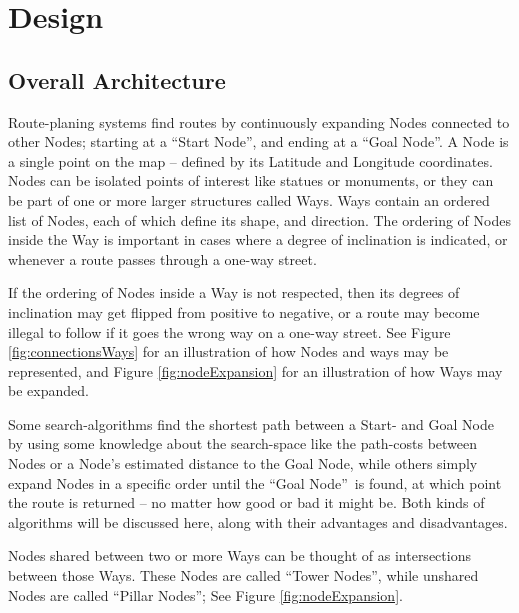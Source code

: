 
\chapter{Design}

\section{Overall Architecture}
Route-planing systems find routes by continuously expanding Nodes connected to other Nodes; starting at a \textquotedblleft Start Node\textquotedblright, and ending at a \textquotedblleft Goal Node\textquotedblright. 
A Node is a single point on the map -- defined by its Latitude and Longitude coordinates. Nodes can be isolated points of interest like statues or monuments, or they can be part of one or more larger structures called Ways.
Ways contain an ordered list of Nodes, each of which define its shape, and direction. The ordering of Nodes inside the Way is important in cases where a degree of inclination is indicated, or whenever a route passes through a one-way street.

If the ordering of Nodes inside a Way is not respected, then its degrees of inclination may get flipped from positive to negative, or a route may become illegal to follow if it goes the wrong way on a one-way street. See Figure \ref{fig:connectionsWays} for an illustration of how Nodes and ways may be represented, and Figure \ref{fig:nodeExpansion} for an illustration of how Ways may be expanded.

Some search-algorithms find the shortest path between a Start- and Goal Node by using some knowledge about the search-space like the path-costs between Nodes or a Node's estimated distance to the Goal Node, while others simply expand Nodes in a specific order until the \textquotedblleft Goal Node\textquotedblright~is found, at which point the route is returned -- no matter how good or bad it might be. Both kinds of algorithms will be discussed here, along with their advantages and disadvantages.

Nodes shared between two or more Ways can be thought of as intersections between those Ways. These Nodes are called \textquotedblleft Tower Nodes\textquotedblright, while unshared Nodes are called \textquotedblleft Pillar Nodes\textquotedblright; See Figure \ref{fig:nodeExpansion}.

